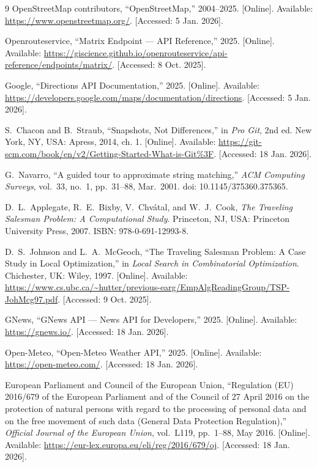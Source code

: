 \documentclass[pdftex,10pt,a4paper,oneside]{article}
\numberwithin{equation}{section} %
\begin{document}
\begin{thebibliography}{9}
OpenStreetMap contributors, ``OpenStreetMap,'' 2004--2025. [Online]. Available: \url{https://www.openstreetmap.org/}. [Accessed: 5 Jan. 2026].

Openrouteservice, ``Matrix Endpoint --- API Reference,'' 2025. [Online]. Available: \url{https://giscience.github.io/openrouteservice/api-reference/endpoints/matrix/}. [Accessed: 8 Oct. 2025].

Google, ``Directions API Documentation,'' 2025. [Online]. Available: \url{https://developers.google.com/maps/documentation/directions}. [Accessed: 5 Jan. 2026].

S.~Chacon and B.~Straub, ``Snapshots, Not Differences,'' in \emph{Pro Git}, 2nd ed. New York, NY, USA: Apress, 2014, ch. 1. [Online]. Available: \url{https://git-scm.com/book/en/v2/Getting-Started-What-is-Git%3F}. [Accessed: 18 Jan. 2026].

G.~Navarro, ``A guided tour to approximate string matching,'' \emph{ACM Computing Surveys}, vol.~33, no.~1, pp.~31--88, Mar.~2001. doi: 10.1145/375360.375365.

D.~L.~Applegate, R.~E.~Bixby, V.~Chv\'atal, and W.~J.~Cook, \emph{The Traveling Salesman Problem: A Computational Study}. Princeton, NJ, USA: Princeton University Press, 2007. ISBN: 978-0-691-12993-8.

D.~S.~Johnson and L.~A.~McGeoch, ``The Traveling Salesman Problem: A Case Study in Local Optimization,'' in \emph{Local Search in Combinatorial Optimization}. Chichester, UK: Wiley, 1997. [Online]. Available: \url{https://www.cs.ubc.ca/~hutter/previous-earg/EmpAlgReadingGroup/TSP-JohMcg97.pdf}. [Accessed: 9 Oct. 2025].

GNews, ``GNews API --- News API for Developers,'' 2025. [Online]. Available: \url{https://gnews.io/}. [Accessed: 18 Jan. 2026].

Open-Meteo, ``Open-Meteo Weather API,'' 2025. [Online]. Available: \url{https://open-meteo.com/}. [Accessed: 18 Jan. 2026].

European Parliament and Council of the European Union, ``Regulation (EU) 2016/679 of the European Parliament and of the Council of 27 April 2016 on the protection of natural persons with regard to the processing of personal data and on the free movement of such data (General Data Protection Regulation),'' \emph{Official Journal of the European Union}, vol.~L119, pp.~1--88, May 2016. [Online]. Available: \url{https://eur-lex.europa.eu/eli/reg/2016/679/oj}. [Accessed: 18 Jan. 2026].


\end{thebibliography}
\end{document}

